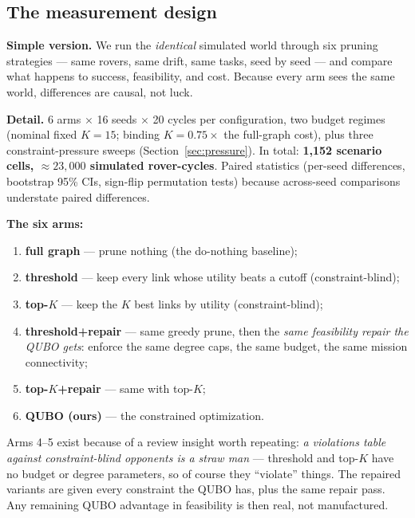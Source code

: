 \documentclass[11pt]{article}
\newenvironment{card}{%
  \def\FrameCommand{\fboxsep=8pt\fcolorbox{cardline}{cardbg}}%
  \MakeFramed{\advance\hsize-\width\FrameRestore}\noindent}{\endMakeFramed}
\newcommand{\key}[1]{\textcolor{quboc}{\textbf{#1}}}
\begin{document}
\subsection{The measurement design}

\begin{card}
\textbf{Simple version.} We run the \emph{identical} simulated world
through six pruning strategies --- same rovers, same drift, same tasks,
seed by seed --- and compare what happens to success, feasibility, and
cost. Because every arm sees the same world, differences are causal, not
luck.
\end{card}

\textbf{Detail.} 6 arms $\times$ 16 seeds $\times$ 20 cycles per
configuration, two budget regimes (nominal fixed $K{=}15$; binding
$K{=}0.75\times$ the full-graph cost), plus three constraint-pressure
sweeps (Section~\ref{sec:pressure}). In total: \key{1{,}152 scenario
cells, $\approx 23{,}000$ simulated rover-cycles}. Paired statistics
(per-seed differences, bootstrap 95\% CIs, sign-flip permutation tests)
because across-seed comparisons understate paired differences.

\textbf{The six arms:}
\begin{enumerate}
\item \textbf{full graph} --- prune nothing (the do-nothing baseline);
\item \textbf{threshold} --- keep every link whose utility beats a cutoff
(constraint-blind);
\item \textbf{top-$K$} --- keep the $K$ best links by utility
(constraint-blind);
\item \textbf{threshold+repair} --- same greedy prune, then the
\emph{same feasibility repair the QUBO gets}: enforce the same degree
caps, the same budget, the same mission connectivity;
\item \textbf{top-$K$+repair} --- same with top-$K$;
\item \textbf{QUBO (ours)} --- the constrained optimization.
\end{enumerate}

Arms 4--5 exist because of a review insight worth repeating: \emph{a
violations table against constraint-blind opponents is a straw man} ---
threshold and top-$K$ have no budget or degree parameters, so of course
they ``violate'' things. The repaired variants are given every constraint
the QUBO has, plus the same repair pass. Any remaining QUBO advantage in
feasibility is then real, not manufactured.
\end{document}
